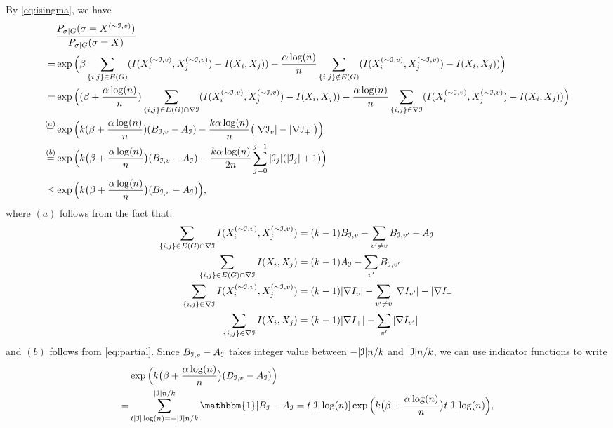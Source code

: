\documentclass{article}
\begin{document}
By \eqref{eq:isingma}, we have
\begin{equation} \label{eq:ts}
\begin{aligned}
& \frac{P_{\sigma|G}(\sigma=X^{(\sim\mathcal{I}, v)})}{P_{\sigma|G}(\sigma=X)} \\
= &\exp\Big(\beta\sum_{\{i,j\}\in E(G)} (I(X_i^{(\sim\mathcal{I}, v)}, X_j^{(\sim\mathcal{I}, v)})
-I(X_i,X_j))
-\frac{\alpha\log(n)}{n} \sum_{\{i,j\}\notin E(G)} (I(X_i^{(\sim\mathcal{I}, v)}, X_j^{(\sim\mathcal{I}, v)})
-I(X_i,X_j)) \Big) \\
=& \exp\Big((\beta+ \frac{\alpha \log(n)}{n})\sum_{\{i,j\}\in E(G) \cap \nabla \mathcal{I}} (I(X_i^{(\sim\mathcal{I}, v)}, X_j^{(\sim\mathcal{I}, v)})
-I(X_i,X_j))
-\frac{\alpha\log(n)}{n} \sum_{\{i,j\} \in \nabla \mathcal{I}}  (I(X_i^{(\sim\mathcal{I}, v)}, X_j^{(\sim\mathcal{I}, v)})
-I(X_i,X_j))\Big) \\
\overset{(a)}{=}  & \exp\Big( k(\beta+ \frac{\alpha \log(n)}{n})( B_{\mathcal{I},v} - A_{\mathcal{I}})
-\frac{k\alpha\log(n)}{n} \big( |\nabla \mathcal{I}_v | - | \nabla \mathcal{I}_+ | \big)\Big) \\
\overset{(b)}{=} & \exp\Big( k\big(\beta+\frac{\alpha\log(n)}{n} \big) (B_{\mathcal{I},v}-A_{\mathcal{I}})
- \frac{k\alpha\log(n)}{2n}\sum_{j=0}^{j-1} | \mathcal{I}_j | ( |\mathcal{I}_j| + 1)
\Big) \\
\le & \exp\Big( k\big(\beta+\frac{\alpha\log(n)}{n} \big) (B_{\mathcal{I},v}-A_{\mathcal{I}})
\Big) ,
\end{aligned}
\end{equation}
where $(a)$ follows from the fact that:
\begin{align*}
\sum_{\{i,j\}\in E(G) \cap \nabla \mathcal{I}} I(X_i^{(\sim\mathcal{I}, v)}, X_j^{(\sim\mathcal{I}, v)}) &= (k-1) B_{\mathcal{I}, v} - \sum_{v'\neq v} B_{\mathcal{I}, v'} - A_{\mathcal{I}} \\
\sum_{\{i,j\}\in E(G) \cap \nabla \mathcal{I}} I(X_i, X_j) &= (k-1)A_{\mathcal{I}} - \sum_{v'} B_{\mathcal{I}, v'} \\
\sum_{\{i,j\}\in \nabla \mathcal{I}} I(X_i^{(\sim\mathcal{I}, v)}, X_j^{(\sim\mathcal{I}, v)}) &= (k-1) |\nabla I_v| - \sum_{v'\neq v} | \nabla I_{v'}| - | \nabla I_{+}| \\
\sum_{\{i,j\}\in \nabla \mathcal{I}} I(X_i, X_j) &= (k-1) | \nabla I_{+} | - \sum_{v'} | \nabla I_{v'} |
\end{align*}
and $(b)$ follows from \eqref{eq:partial}.
Since $B_{\mathcal{I},v}-A_{\mathcal{I}}$ takes integer value between $-|\mathcal{I}|n/k$ and $|\mathcal{I}|n/k$,
we can use indicator functions to write
\begin{align*}
& \exp\Big(k\big(\beta+\frac{\alpha\log(n)}{n} \big) (B_{\cI,v}-A_{\cI}) \Big) \\
= & \sum_{t|\cI|\log(n)=-|\cI|n/k}^{|\cI|n/k}
\mathbbm{1}[B_{\cI}-A_{\cI}=t|\cI| \log(n)] \exp\Big(k\big(\beta+\frac{\alpha\log(n)}{n} \big) t|\cI| \log(n) \Big) ,
\end{align*}
\end{document}
